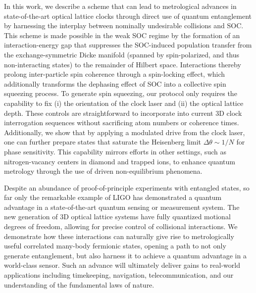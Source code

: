 \documentclass[aps,prx,superscriptaddress,notitlepage,twocolumn,longbibliography]{revtex4-2}
\begin{document}
In this work, we describe a scheme that can lead to metrological advances in state-of-the-art optical lattice clocks through direct use of quantum entanglement by harnessing the interplay between nominally undesirable collisions and SOC.
This scheme is made possible in the weak SOC regime by the formation of an interaction-energy gap that suppresses the SOC-induced population transfer from the exchange-symmetric Dicke manifold (spanned by spin-polarized, and thus non-interacting states) to the remainder of Hilbert space.
Interactions thereby prolong inter-particle spin coherence through a spin-locking effect, which additionally transforms the dephasing effect of SOC into a collective spin squeezing process.
To generate spin squeezing, our protocol only requires the capability to fix (i) the orientation of the clock laser and (ii) the optical lattice depth.
These controls are straightforward to incorporate into current 3D clock interrogation sequences without sacrificing atom numbers or coherence times.
Additionally, we show that by applying a modulated drive from the clock laser, one can further prepare states that saturate the Heisenberg limit $\Delta\theta\sim1/N$ for phase sensitivity\cite{kitagawa1993squeezed, ma2011quantum, degen2017quantum}.
This capability mirrors efforts in other settings, such as nitrogen-vacancy centers in diamond\cite{bauch2018ultralong, aiello2013compositepulse} and trapped ions\cite{burd2019quantum}, to enhance quantum metrology through the use of driven non-equilibrium phenomena.

Despite an abundance of proof-of-principle experiments with entangled states\cite{degen2017quantum, pezze2018quantum}, so far only the remarkable example of LIGO\cite{aasi2013enhanced, abbott2016gw150914} has demonstrated a quantum advantage in a state-of-the-art quantum sensing or measurement system.
The new generation of 3D optical lattice systems have fully quantized motional degrees of freedom\cite{campbell2017fermidegenerate}, allowing for precise control of collisional interactions.
We demonstrate how these interactions can naturally give rise to metrologically useful correlated many-body fermionic states, opening a path to not only generate entanglement, but also harness it to achieve a quantum advantage in a world-class sensor.
Such an advance will ultimately deliver gains to real-world applications including timekeeping, navigation, telecommunication, and our understanding of the fundamental laws of nature\cite{safronova2018search}.

\end{document}
